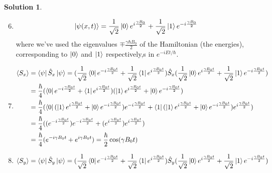 \documentclass[10pt]{article}
\theoremstyle{definition}
\newtheorem{soln}{Solution}
\begin{document}
\begin{soln}
  \begin{enumerate}[label=(\alph*)]
    \setcounter{enumi}{5}
    \item $$\ket{\psi(x,t)}=\frac{1}{\sqrt{2}}\ket{0}e^{i\frac{\gamma B_0}{2}}+\frac{1}{\sqrt{2}}\ket{1}e^{-i\frac{\gamma B_0}{2}}$$
          where we've used the eigenvalues $\mp\frac{\gamma \hbar B_0}{2}$ of the Hamiltonian (the energies), corresponding to $\ket{0}$ and $\ket{1}$ respectively,s in $e^{-iEt/\hbar}$.
    \item
          \begin{align*}
            \langle S_x\rangle & =\bra{\psi}\hat{S}_x\ket{\psi}=(\frac{1}{\sqrt{2}}\bra{0}e^{-i\frac{\gamma B_0t}{2}}+\frac{1}{\sqrt{2}}\bra{1}e^{i\frac{\gamma B_0t}{2}})
            \hat{S}_x(\frac{1}{\sqrt{2}}\ket{0}e^{i\frac{\gamma B_0t}{2}}+\frac{1}{\sqrt{2}}\ket{1}e^{-i\frac{\gamma B_0t}{2}})                                                                                                                                     \\
                               & =\frac{\hbar}{4}(\bra{0}e^{-i\frac{\gamma B_0t}{2}}+\bra{1}e^{i\frac{\gamma B_0t}{2}})
            (\ket{1}e^{i\frac{\gamma B_0t}{2}}+\ket{0}e^{-i\frac{\gamma B_0t}{2}})                                                                                                                                                                                  \\
                               & =\frac{\hbar}{4}(\bra{0}(\ket{1}e^{i\frac{\gamma B_0t}{2}}+\ket{0}e^{-i\frac{\gamma B_0t}{2}})e^{-i\frac{\gamma B_0t}{2}}+\bra{1}(\ket{1}e^{i\frac{\gamma B_0t}{2}}+\ket{0}e^{-i\frac{\gamma B_0t}{2}})e^{i\frac{\gamma B_0t}{2}}) \\
                               & =\frac{\hbar}{4}((e^{-i\frac{\gamma B_0t}{2}})e^{-i\frac{\gamma B_0t}{2}}+(e^{i\frac{\gamma B_0t}{2}})e^{i\frac{\gamma B_0t}{2}})                                                                                                  \\
                               & =\frac{\hbar}{4}(e^{-i\gamma B_0t}+e^{i\gamma B_0t})=\frac{\hbar}{2}\cos(\gamma B_0t)
          \end{align*}
    \item  \begin{align*}
            \langle S_y\rangle & =\bra{\psi}\hat{S}_y\ket{\psi}=(\frac{1}{\sqrt{2}}\bra{0}e^{-i\frac{\gamma B_0t}{2}}+\frac{1}{\sqrt{2}}\bra{1}e^{i\frac{\gamma B_0t}{2}})
            \hat{S}_y(\frac{1}{\sqrt{2}}\ket{0}e^{i\frac{\gamma B_0t}{2}}+\frac{1}{\sqrt{2}}\ket{1}e^{-i\frac{\gamma B_0t}{2}})                                                                                                                                           \\

\end{align*}
\end{enumerate}
\end{soln}
\end{document}
